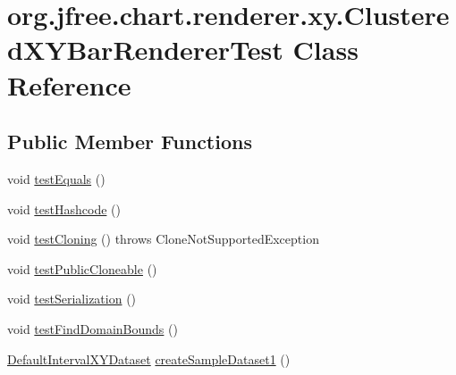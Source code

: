 \hypertarget{classorg_1_1jfree_1_1chart_1_1renderer_1_1xy_1_1_clustered_x_y_bar_renderer_test}{}\section{org.\+jfree.\+chart.\+renderer.\+xy.\+Clustered\+X\+Y\+Bar\+Renderer\+Test Class Reference}
\label{classorg_1_1jfree_1_1chart_1_1renderer_1_1xy_1_1_clustered_x_y_bar_renderer_test}
\subsection*{Public Member Functions}
\begin{DoxyCompactItemize}
\item 
void \mbox{\hyperlink{classorg_1_1jfree_1_1chart_1_1renderer_1_1xy_1_1_clustered_x_y_bar_renderer_test_abb86ec8759211590b91b24736119fe87}{test\+Equals}} ()
\item 
void \mbox{\hyperlink{classorg_1_1jfree_1_1chart_1_1renderer_1_1xy_1_1_clustered_x_y_bar_renderer_test_abf73a9e161c2b404861d81c8fd5b0ac5}{test\+Hashcode}} ()
\item 
void \mbox{\hyperlink{classorg_1_1jfree_1_1chart_1_1renderer_1_1xy_1_1_clustered_x_y_bar_renderer_test_a1dd4afc3c03a72b8314550f61f3a68f6}{test\+Cloning}} ()  throws Clone\+Not\+Supported\+Exception 
\item 
void \mbox{\hyperlink{classorg_1_1jfree_1_1chart_1_1renderer_1_1xy_1_1_clustered_x_y_bar_renderer_test_ad512294ba9b449cab1f8ddca1a43c287}{test\+Public\+Cloneable}} ()
\item 
void \mbox{\hyperlink{classorg_1_1jfree_1_1chart_1_1renderer_1_1xy_1_1_clustered_x_y_bar_renderer_test_a79529cddc46d5910bd248fc159735bcd}{test\+Serialization}} ()
\item 
void \mbox{\hyperlink{classorg_1_1jfree_1_1chart_1_1renderer_1_1xy_1_1_clustered_x_y_bar_renderer_test_a7647ba98e4512df3b29cb7cb67fff14a}{test\+Find\+Domain\+Bounds}} ()
\item 
\mbox{\hyperlink{classorg_1_1jfree_1_1data_1_1xy_1_1_default_interval_x_y_dataset}{Default\+Interval\+X\+Y\+Dataset}} \mbox{\hyperlink{classorg_1_1jfree_1_1chart_1_1renderer_1_1xy_1_1_clustered_x_y_bar_renderer_test_aa770c2f2131e1fe06adfc29397bdf9ba}{create\+Sample\+Dataset1}} ()
\end{DoxyCompactItemize}


